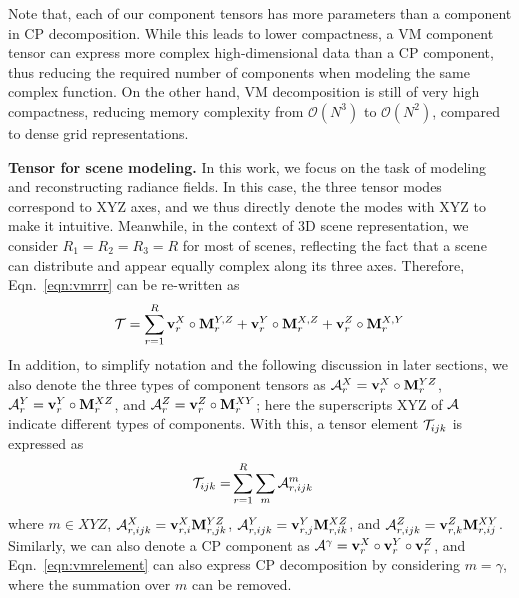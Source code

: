 \documentclass[runningheads]{llncs}
\newcommand{\boldstartspace}[1]{\vspace{0.1in}\noindent\textbf{#1}}
\begin{document}
Note that, each of our component tensors has more parameters than a component in CP decomposition. 
While this leads to lower compactness, a VM component tensor can express more complex high-dimensional data than a CP component, thus reducing the required number of components when modeling the same complex function. 
On the other hand, VM decomposition is still of very high compactness, reducing memory complexity from $\mathcal{O}(N^3)$ to $\mathcal{O}(N^2)$, compared to dense grid representations.


\boldstartspace{Tensor for scene modeling.} 
In this work, we focus on the task of modeling and reconstructing radiance fields.
In this case, the three tensor modes correspond to XYZ axes, and we thus directly denote the modes with XYZ to make it intuitive.
Meanwhile, in the context of 3D scene representation, we consider $R_1=R_2=R_3=R$ for most of scenes, reflecting the fact that a scene can distribute and appear equally complex along its three axes.
Therefore, Eqn.~\ref{eqn:vmrrr} can be re-written as
\begin{equation}
    \mathcal{T} = \sum_{r=1}^{R} \mathbf{v}_r^{X} \circ \mathbf{M}_r^{Y,Z} + \mathbf{v}_r^{Y} \circ \mathbf{M}_r^{X,Z} + \mathbf{v}_r^{Z} \circ \mathbf{M}_r^{X,Y}
    \label{eqn:vmr}
\end{equation}
In addition, to simplify notation and the following discussion in later sections, we also denote the three types of component tensors as $\mathcal{A}^X_r=\mathbf{v}_r^X \circ \mathbf{M}_r^{YZ}$, $\mathcal{A}^Y_r=\mathbf{v}_r^Y \circ \mathbf{M}_r^{XZ}$, and $\mathcal{A}^Z_r=\mathbf{v}_r^Z \circ \mathbf{M}_r^{XY}$; here the superscripts XYZ of $\mathcal{A}$ indicate different types of components.
With this, a tensor element $\mathcal{T}_{ijk}$ is expressed as
\begin{align}
    \mathcal{T}_{ijk} = & \sum_{r=1}^{R} \sum_{m} \mathcal{A}_{r,ijk}^m
    \label{eqn:vmrelement}
\end{align}
where $m\in XYZ$, $\mathcal{A}^X_{r,ijk}=\mathbf{v}_{r,i}^X \mathbf{M}_{r,jk}^{YZ}$, $\mathcal{A}^Y_{r,ijk}=\mathbf{v}_{r,j}^Y \mathbf{M}_{r,ik}^{XZ}$, and $\mathcal{A}^Z_{r,ijk}=\mathbf{v}_{r,k}^Z \mathbf{M}_{r,ij}^{XY}$. Similarly, we can also denote a CP component as $\mathcal{A}^{\gamma}=\mathbf{v}_r^X \circ \mathbf{v}_r^Y \circ \mathbf{v}_r^Z$, and Eqn.~\ref{eqn:vmrelement} can also express CP decomposition by considering $m=\gamma$, where the summation over $m$ can be removed.
 
\end{document}
